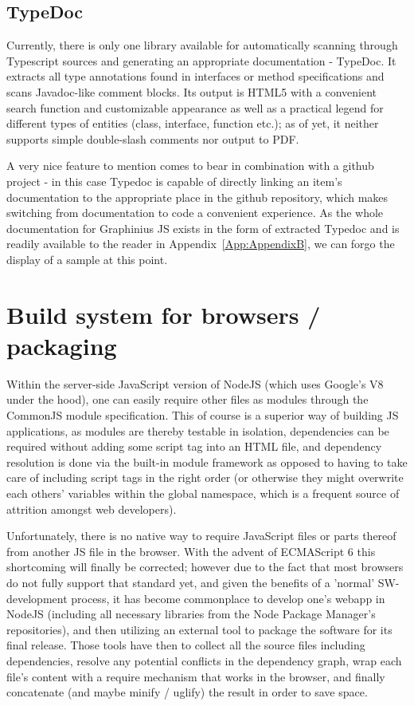 	\subsection{TypeDoc}
	\label{ssect:typedoc}
	
	Currently, there is only one library available for automatically scanning through Typescript sources and generating an appropriate documentation - TypeDoc. It extracts all type annotations found in interfaces or method specifications and scans Javadoc-like comment blocks. Its output is HTML5 with a convenient search function and customizable appearance as well as a practical legend for different types of entities (class, interface, function etc.); as of yet, it neither supports simple double-slash comments nor output to PDF. 
	
	A very nice feature to mention comes to bear in combination with a github project - in this case Typedoc is capable of directly linking an item's documentation to the appropriate place in the github repository, which makes switching from documentation to code a convenient experience. As the whole documentation for Graphinius JS exists in the form of extracted Typedoc and is readily available to the reader in Appendix~\ref{App:AppendixB}, we can forgo the display of a sample at this point.
	

\section{Build system for browsers / packaging}
\label{sect:build_browser}

	Within the server-side JavaScript version of NodeJS (which uses Google's V8 under the hood), one can easily require other files as modules through the CommonJS module specification. This of course is a superior way of building JS applications, as modules are thereby testable in isolation, dependencies can be required without adding some script tag into an HTML file, and dependency resolution is done via the built-in module framework as opposed to having to take care of including script tags in the right order (or otherwise they might overwrite each others' variables within the global namespace, which is a frequent source of attrition amongst web developers).
	
	Unfortunately, there is no native way to require JavaScript files or parts thereof from another JS file in the browser. With the advent of ECMAScript 6 this shortcoming will finally be corrected; however due to the fact that most browsers do not fully support that standard yet, and given the benefits of a 'normal' SW-development process, it has become commonplace to develop one's webapp in NodeJS (including all necessary libraries from the Node Package Manager's repositories), and then utilizing an external tool to package the software for its final release. Those tools have then to collect all the source files including dependencies, resolve any potential conflicts in the dependency graph, wrap each file's content with a require mechanism that works in the browser, and finally concatenate (and maybe minify / uglify) the result in order to save space.

